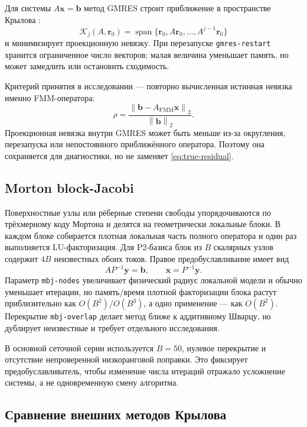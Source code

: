 \documentclass[12pt,a4paper]{article}
\newcommand{\norm}[1]{\left\lVert #1\right\rVert}
\begin{document}
Для системы $A\mathbf x=\mathbf b$ метод GMRES строит приближение в пространстве
Крылова \cite{saad1986}:
\begin{equation}
  \mathcal K_j(A,\mathbf r_0)=
  \operatorname{span}\{\mathbf r_0,A\mathbf r_0,\ldots,A^{j-1}\mathbf r_0\}
\end{equation}
и минимизирует проекционную невязку. При перезапуске
\texttt{gmres-restart} хранится ограниченное число векторов; малая величина
уменьшает память, но может замедлить или остановить сходимость.

Критерий принятия в исследовании --- повторно вычисленная истинная невязка
именно FMM-оператора:
\begin{equation}
  \rho=\frac{\norm{\mathbf b-A_{\mathrm{FMM}}\mathbf x}_2}
  {\norm{\mathbf b}_2}.
  \label{eq:true-residual}
\end{equation}
Проекционная невязка внутри GMRES может быть меньше из-за округления,
перезапуска или непостоянного приближённого оператора. Поэтому она сохраняется
для диагностики, но не заменяет \eqref{eq:true-residual}.

\subsection{Morton block-Jacobi}

Поверхностные узлы или рёберные степени свободы упорядочиваются по трёхмерному
коду Мортона и делятся на геометрически локальные блоки. В каждом блоке
собирается плотная локальная часть полного оператора и один раз выполняется
LU-факторизация. Для P2-базиса блок из $B$ скалярных узлов содержит
$4B$ неизвестных обоих токов. Правое предобуславливание имеет вид
\begin{equation}
  A P^{-1}\mathbf y=\mathbf b,\qquad
  \mathbf x=P^{-1}\mathbf y.
\end{equation}
Параметр \texttt{mbj-nodes} увеличивает физический радиус локальной модели и
обычно уменьшает итерации, но память/время плотной факторизации блока растут
приблизительно как $O(B^2)$/$O(B^3)$, а одно применение --- как $O(B^2)$.
Перекрытие \texttt{mbj-overlap} делает метод ближе к аддитивному Шварцу, но
дублирует неизвестные и требует отдельного исследования.

В основной сеточной серии используется $B=50$, нулевое перекрытие и отсутствие
непроверенной низкоранговой поправки. Это фиксирует предобуславливатель, чтобы
изменение числа итераций отражало усложнение системы, а не одновременную смену
алгоритма.

\subsection{Сравнение внешних методов Крылова}
\end{document}
